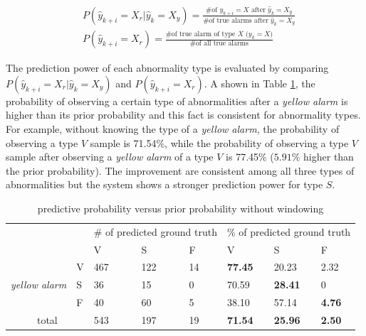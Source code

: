 \begin{align}
\nonumber 
&P(\hat{y}_{k+i}=X_r|\hat{y}_{k}=X_y)=\frac{\text{\# of $y_{k+i}=X$ after $\hat{y}_k=X_y$}}{\text{\# of true alarms after $\hat{y}_k=X_y$}} \\
&P(\hat{y}_{k+i}=X_r)=\frac{\text{\# of true alarm of type $X$ ($y_{k}=X$)}}{\text{\# of all true alarms}} 
\end{align}

The prediction power of each abnormality type is evaluated by comparing $P(\hat{y}_{k+i}=X_r|\hat{y}_{k}=X_y)$ and $P(\hat{y}_{k+i}=X_r)$. A shown in Table \ref{table:pred}, the probability of observing a certain type of abnormalities after a \textit{yellow alarm} is higher than its prior probability and this fact is consistent for abnormality types. For example, without knowing the type of a \textit{yellow alarm}, the probability of observing a type $V$ sample is 71.54\%, while the probability of observing a type $V$ sample after observing a \textit{yellow alarm} of a type $V$ is 77.45\% ($5.91\%$ higher than the prior probability). The improvement are consistent among all three types of abnormalities but the system shows a stronger prediction power for type $S$. 

\begin{table}[t]
\centering
\caption{predictive probability versus prior probability without windowing}
\label{table:pred}
\begin{tabular}{|c|l|l|l|l||l|l|l|}
\hline
\multicolumn{2}{|l|}{\multirow{2}{*}{}} & \multicolumn{3}{l|}{\# of predicted ground truth} & \multicolumn{3}{l|}{\% of predicted ground truth} \\ \cline{3-8} 
\multicolumn{2}{|l|}{}                  & V               & S               & F             & V               & S               & F             \\ \hline
\multirow{3}{*}{\textit{yellow alarm}}    & V    & 467             & 122              & 14            & \textbf{77.45}  & 20.23           & 2.32          \\ \cline{2-8} 
                                 & S    & 36              & 15              & 0             & 70.59           & \textbf{28.41}  & 0             \\ \cline{2-8} 
                                 & F    & 40              & 60              & 5             & 38.10           & 57.14           & \textbf{4.76} \\ \hline
\multicolumn{2}{|c|}{total}             & 543             & 197             & 19            & \textbf{71.54}  & \textbf{25.96}  & \textbf{2.50} \\ \hline
\end{tabular}
\end{table}

